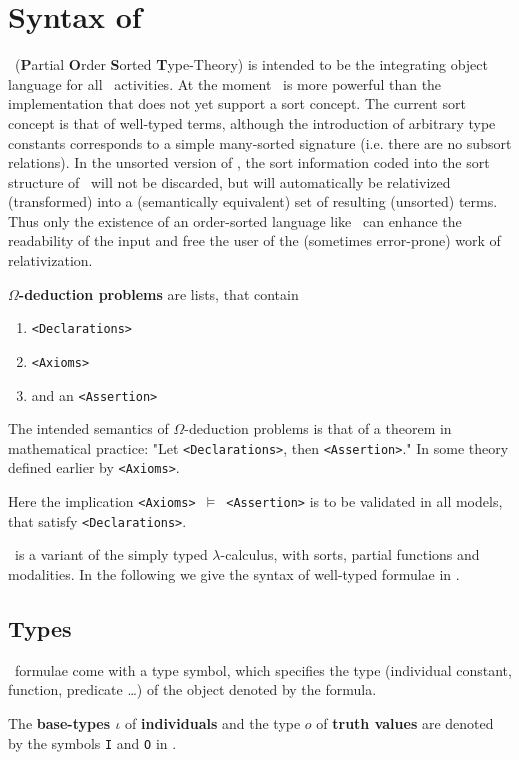 \chapter{Syntax of \protect{\post}}
\label{App:post-syntax}
\post\ ({\bf P}artial {\bf O}rder {\bf S}orted {\bf T}ype-Theory) is intended to be the integrating object
language for all \keim\ activities. At the moment \post\ is more powerful than the implementation that does
not yet support a sort concept. The current sort concept is that of well-typed terms, although the
introduction of arbitrary type constants corresponds to a simple many-sorted signature (i.e. there are no
subsort relations). In the unsorted version of \keim, the sort information coded into the sort
structure of \post\ will not be discarded, but will automatically be relativized (transformed) into a
(semantically equivalent) set of resulting (unsorted) terms. Thus only the existence of an order-sorted
language like \post\ can enhance the readability of the input and free the user of the (sometimes
error-prone) work of relativization.


{\bf $\Omega$-deduction problems} are lists, that contain
\begin{enumerate}
\item {\tt <Declarations>}
\item {\tt <Axioms>}
\item and an {\tt <Assertion>}
\end{enumerate}
The intended semantics of $\Omega$-deduction problems is that of a
theorem in mathematical practice: "Let {\tt <Declarations>}, then
{\tt <Assertion>}." In some theory defined earlier by {\tt <Axioms>}.\par
Here the implication {\tt <Axioms> $\models$ <Assertion>} is to be
validated in all models, that satisfy {\tt <Declarations>}.\par
\post\ is a variant of the simply typed $\lambda$-calculus, with
sorts, partial functions and modalities. In the following we give the
syntax of well-typed formulae in \post.

\section{Types}
\post\ formulae come with a type symbol, which specifies the type
(individual constant, function, predicate \ldots) of the object denoted
by the formula.\par
The {\bf base-types $\iota$} of {\bf individuals} and the type $o$ of {\bf truth values} are
denoted by the symbols {\tt I} and {\tt O} in \post.

